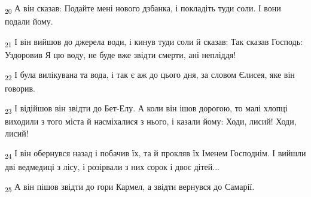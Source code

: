 \begin{tcolorbox}
\textsubscript{20} А він сказав: Подайте мені нового дзбанка, і покладіть туди соли. І вони подали йому.
\end{tcolorbox}
\begin{tcolorbox}
\textsubscript{21} І він вийшов до джерела води, і кинув туди соли й сказав: Так сказав Господь: Уздоровив Я цю воду, не буде вже звідти смерти, ані непліддя!
\end{tcolorbox}
\begin{tcolorbox}
\textsubscript{22} І була вилікувана та вода, і так є аж до цього дня, за словом Єлисея, яке він говорив.
\end{tcolorbox}
\begin{tcolorbox}
\textsubscript{23} І відійшов він звідти до Бет-Елу. А коли він ішов дорогою, то малі хлопці виходили з того міста й насміхалися з нього, і казали йому: Ходи, лисий! Ходи, лисий!
\end{tcolorbox}
\begin{tcolorbox}
\textsubscript{24} І він обернувся назад і побачив їх, та й прокляв їх Іменем Господнім. І вийшли дві ведмедиці з лісу, і розірвали з них сорок і двоє дітей...
\end{tcolorbox}
\begin{tcolorbox}
\textsubscript{25} А він пішов звідти до гори Кармел, а звідти вернувся до Самарії.
\end{tcolorbox}
